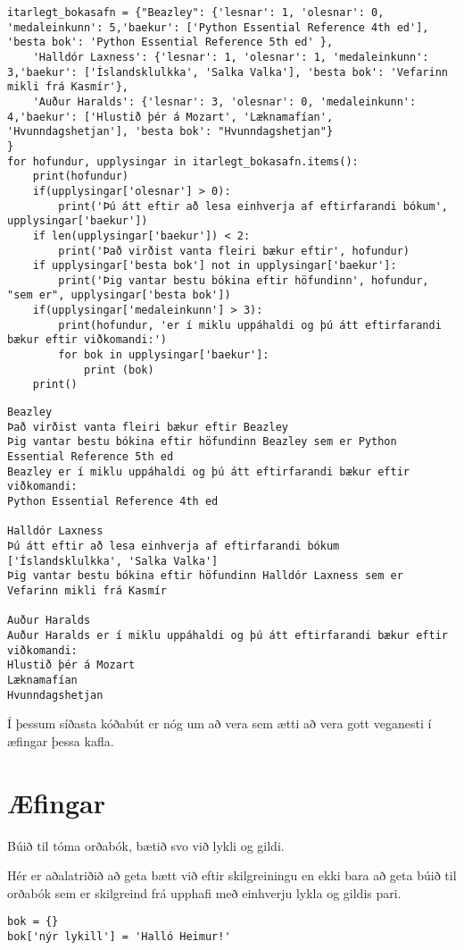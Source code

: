 \begin{lstlisting}[caption=Orðabók sem inniheldur orðabók sem gildi, label=lst:dict-dict]
itarlegt_bokasafn = {"Beazley": {'lesnar': 1, 'olesnar': 0, 'medaleinkunn': 5,'baekur': ['Python Essential Reference 4th ed'], 'besta bok': 'Python Essential Reference 5th ed' },
	'Halldór Laxness': {'lesnar': 1, 'olesnar': 1, 'medaleinkunn': 3,'baekur': ['Íslandsklulkka', 'Salka Valka'], 'besta bok': 'Vefarinn mikli frá Kasmír'}, 
	'Auður Haralds': {'lesnar': 3, 'olesnar': 0, 'medaleinkunn': 4,'baekur': ['Hlustið þér á Mozart', 'Læknamafían', 'Hvunndagshetjan'], 'besta bok': "Hvunndagshetjan"}
}
for hofundur, upplysingar in itarlegt_bokasafn.items():
	print(hofundur)
	if(upplysingar['olesnar'] > 0):
		print('Þú átt eftir að lesa einhverja af eftirfarandi bókum', upplysingar['baekur'])
	if len(upplysingar['baekur']) < 2:
		print('Það virðist vanta fleiri bækur eftir', hofundur)
	if upplysingar['besta bok'] not in upplysingar['baekur']:
		print('Þig vantar bestu bókina eftir höfundinn', hofundur, "sem er", upplysingar['besta bok'])
	if(upplysingar['medaleinkunn'] > 3):
		print(hofundur, 'er í miklu uppáhaldi og þú átt eftirfarandi bækur eftir viðkomandi:')
		for bok in upplysingar['baekur']:
			print (bok)
	print()
\end{lstlisting}
\lstset{style=uttak}
\begin{lstlisting}
Beazley
Það virðist vanta fleiri bækur eftir Beazley
Þig vantar bestu bókina eftir höfundinn Beazley sem er Python Essential Reference 5th ed
Beazley er í miklu uppáhaldi og þú átt eftirfarandi bækur eftir viðkomandi:
Python Essential Reference 4th ed

Halldór Laxness
Þú átt eftir að lesa einhverja af eftirfarandi bókum ['Íslandsklulkka', 'Salka Valka']
Þig vantar bestu bókina eftir höfundinn Halldór Laxness sem er Vefarinn mikli frá Kasmír

Auður Haralds
Auður Haralds er í miklu uppáhaldi og þú átt eftirfarandi bækur eftir viðkomandi:
Hlustið þér á Mozart
Læknamafían
Hvunndagshetjan
\end{lstlisting}
\lstset{style=venjulegt}

Í þessum síðasta kóðabút er nóg um að vera sem ætti að vera gott veganesti í æfingar þessa kafla.

\newpage
\section{Æfingar}
\begin{exercise}\label{dic1}
Búið til tóma orðabók, bætið svo við lykli og gildi.
\end{exercise}
\begin{Answer}[ref={dic1}]
Hér er aðalatriðið að geta bætt við eftir skilgreiningu en ekki bara að geta búið til orðabók sem er skilgreind frá upphafi með einhverju lykla og gildis pari.
\begin{lstlisting}
bok = {}
bok['nýr lykill'] = 'Halló Heimur!'
\end{lstlisting}
\end{Answer}

